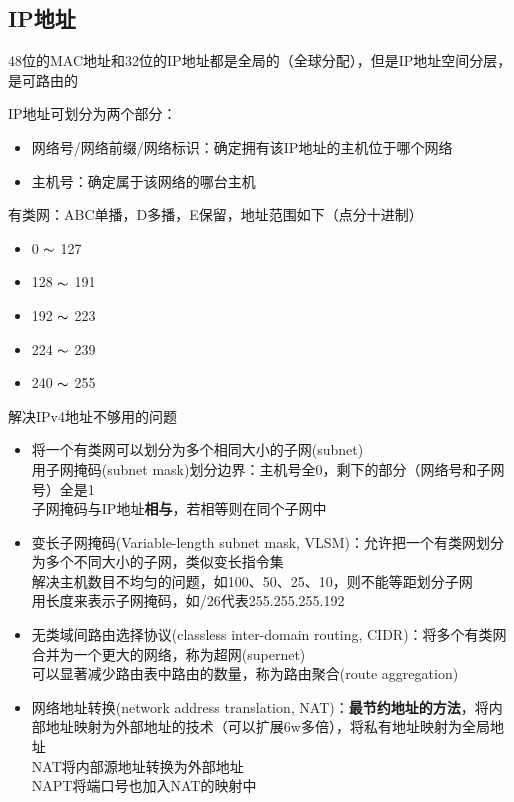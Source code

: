 \subsection{IP地址}
48位的MAC地址和32位的IP地址都是全局的（全球分配），但是IP地址空间分层，是可路由的

IP地址可划分为两个部分：
\begin{itemize}
	\item 网络号/网络前缀/网络标识：确定拥有该IP地址的主机位于哪个网络
	\item 主机号：确定属于该网络的哪台主机
\end{itemize}

有类网：ABC单播，D多播，E保留，地址范围如下（点分十进制）
\begin{itemize}
	\item 0 $\thicksim$ 127
	\item 128 $\thicksim$ 191
	\item 192 $\thicksim$ 223
	\item 224 $\thicksim$ 239
	\item 240 $\thicksim$ 255
\end{itemize}

解决IPv4地址不够用的问题
\begin{itemize}
	\item 将一个有类网可以划分为多个相同大小的子网(subnet)\\
用子网掩码(subnet mask)划分边界：主机号全0，剩下的部分（网络号和子网号）全是1\\
子网掩码与IP地址\textbf{相与}，若相等则在同个子网中
	\item 变长子网掩码(Variable-length subnet mask, VLSM)：允许把一个有类网划分为多个不同大小的子网，类似变长指令集\\
解决主机数目不均匀的问题，如100、50、25、10，则不能等距划分子网\\
用长度来表示子网掩码，如/26代表255.255.255.192
	\item 无类域间路由选择协议(classless inter-domain routing, CIDR)：将多个有类网合并为一个更大的网络，称为超网(supernet)\\
可以显著减少路由表中路由的数量，称为路由聚合(route aggregation)
	\item 网络地址转换(network address translation, NAT)：\textbf{最节约地址的方法}，将内部地址映射为外部地址的技术（可以扩展6w多倍），将私有地址映射为全局地址\\
NAT将内部源地址转换为外部地址\\
NAPT将端口号也加入NAT的映射中
\end{itemize}


